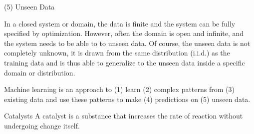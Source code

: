   \begin{frame}{(5) Unseen Data}
    \begin{withmargin}
      \begin{tdmain}
          In a closed system or domain, the data is finite and the system can be fully specified by optimization.
          However, often the domain is open and infinite, and the system needs to be able to  to unseen data.
          Of course, the unseen data is not completely unknown, it is drawn from the same distribution (i.i.d.) as the 
          training data and is thus able to generalize to the unseen data inside a specific domain or distribution.
      \end{tdmain}
      \begin{tdmargin}
          Machine learning is an approach to (1) learn (2) complex patterns
          from (3) existing data and use these patterns to make (4)
          predictions on (5) unseen data.
      \end{tdmargin}
    \end{withmargin}
  \end{frame}


\begin{frame}{Catalysts}
    A catalyst is a substance that increases the rate of reaction without 
    undergoing change itself.
  \begin{columns}[T,onlytextwidth]
  \end{columns}
\end{frame}

